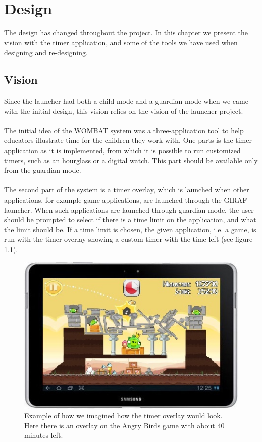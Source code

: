 \chapter{Design}
The design has changed throughout the project. In this chapter we present the vision with the timer application, and some of the tools we have used when designing and re-designing.

\section{Vision}
\label{sec:vision}
Since the launcher had both a child-mode and a guardian-mode when we came with the initial design, this vision relies on the vision of the launcher project.\\ \\
	The initial idea of the WOMBAT system was a three-application tool to help educators illustrate time for the children they work with. One parts is the timer application as it is implemented, from which it is possible to run customized timers, such as an hourglass or a digital watch. This part should be available only from the guardian-mode.\\ \\
  The second part of the system is a timer overlay, which is launched when other applications, for example game applications, are launched through the GIRAF launcher. When such applications are launched through guardian mode, the user should be prompted to select if there is a time limit on the application, and what the limit should be. If a time limit is chosen, the given application, i.e. a game, is run with the timer overlay showing a custom timer with the time left (see figure \ref{fig:init_overlay_drawings}).
	
\begin{figure}[H]
	\centering
		\includegraphics[width=\textwidth]{Images/paper_prototype/overlay.png}
			\caption{Example of how we imagined how the timer overlay would look. Here there is an overlay on the Angry Birds game with about 40 minutes left.}
	\label{fig:init_overlay_drawings}
\end{figure}
	
